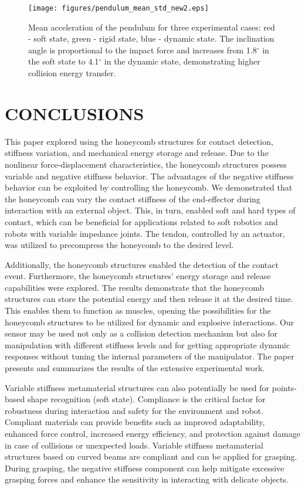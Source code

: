 \documentclass[lettersize,journal]{IEEEtran}
\begin{document}
\begin{figure}[thpb]
\centering
    \texttt{[image: figures/pendulum\_mean\_std\_new2.eps]}
\caption {Mean acceleration of the pendulum for three experimental cases: red - soft state, green - rigid state, blue - dynamic state. The inclination angle is proportional to the impact force and increases from 1.8$^{\circ}$  in the soft state to 4.1$^{\circ}$  in the dynamic state, demonstrating higher collision energy transfer.}
\label{allpeaks_boxplot}
\vspace{-3mm}
\end{figure}


\section{CONCLUSIONS}
\label{sec:conclusion}

This paper explored using the honeycomb structures for contact detection, stiffness variation, and mechanical energy storage and release. Due to the nonlinear force-displacement characteristics, the honeycomb structures possess variable and negative stiffness behavior. The advantages of the negative stiffness behavior can be exploited by controlling the honeycomb. We demonstrated that the honeycomb can vary the contact stiffness of the end-effector during interaction with an external object. This, in turn, enabled soft and hard types of contact, which can be beneficial for applications related to soft robotics and robots with variable impedance joints. The tendon, controlled by an actuator, was utilized to precompress the honeycomb to the desired level.

Additionally, the honeycomb structures enabled the detection of the contact event. Furthermore, the honeycomb structures' energy storage and release capabilities were explored. The results demonstrate that the honeycomb structures can store the potential energy and then release it at the desired time. This enables them to function as muscles, opening the possibilities for the honeycomb structures to be utilized for dynamic and explosive interactions.  Our sensor may be used not only as a collision detection mechanism but also for manipulation with different stiffness levels and for getting appropriate dynamic responses without tuning the internal parameters of the manipulator. The paper presents and summarizes the results of the extensive experimental work. 

Variable stiffness metamaterial structures can also potentially be used for points-based shape recognition (soft state). Compliance is the critical factor for robustness during interaction and safety for the environment and robot. Compliant materials can provide benefits such as improved adaptability, enhanced force control, increased energy efficiency, and protection against damage in case of collisions or unexpected loads. Variable stiffness metamaterial structures based on curved beams are compliant and can be applied for grasping. During grasping, the negative stiffness component can help mitigate excessive grasping forces and enhance the sensitivity in interacting with delicate objects.
\end{document}
